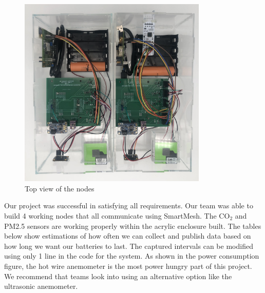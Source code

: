 \begin{figure}[H]
    \centering
    \includegraphics[width=0.8\textwidth]{Pictures/topview.jpg}
    \caption[Top view of the node]{Top view of the nodes} 
    \label{fig:results}
\end{figure}
Our project was successful in satisfying all requirements. Our team was able to build 4 working nodes that all communicate using SmartMesh. The CO$_2$ and PM2.5 sensors are working properly within the acrylic enclosure built. The tables below show estimations of how often we can collect and publish data based on how long we want our batteries to last. The captured intervals can be modified using only 1 line in the code for the system. As shown in the power consumption figure, the hot wire anemometer is the most power hungry part of this project. We recommend that teams look into using an alternative option like the ultrasonic anemometer.\\\\
\begin{table}[h]
\centering
{}
\caption{Component Measurement Periods for 3 month, 6 month, and 1 year battery life for units without anemometer
}
\label{tab:no annemometer}
\end{table}

